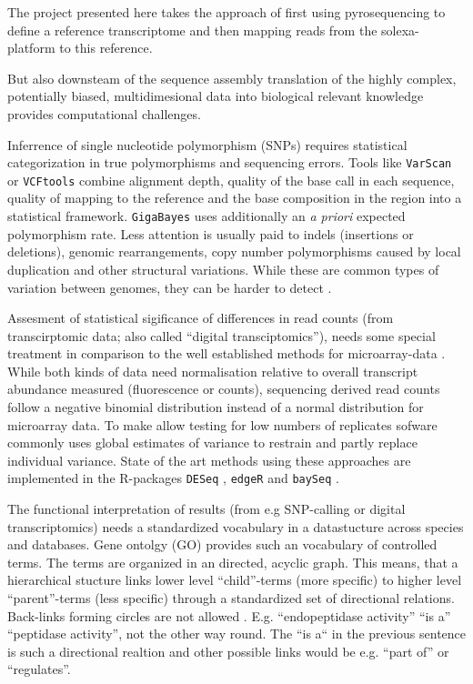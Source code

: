 The project presented here takes the approach of first using
pyrosequencing to define a reference transcriptome and then mapping
reads from the solexa-platform to this reference.

But also downsteam of the sequence assembly translation of the highly
complex, potentially biased, multidimesional data into biological
relevant knowledge provides computational challenges.

Inferrence of single nucleotide polymorphism (SNPs) requires
statistical categorization in true polymorphisms and sequencing
errors. Tools like \texttt{VarScan} \cite{pmid19542151} or
\texttt{VCFtools} \cite{pmid21653522} combine alignment depth, quality
of the base call in each sequence, quality of mapping to the reference
and the base composition in the region into a statistical
framework. \texttt{GigaBayes} \cite{pmid18204455} uses additionally an
\textit{a priori} expected polymorphism rate. Less attention is
usually paid to indels (insertions or deletions), genomic
rearrangements, copy number polymorphisms caused by local duplication
and other structural variations. While these are common types of
variation between genomes, they can be harder to detect
\cite{pmid22084086}.

Assesment of statistical sigificance of differences in read counts
(from transcirptomic data; also called ``digital transciptomics''),
needs some special treatment in comparison to the well established
methods for microarray-data \cite{smyth2005limma}. While both kinds of
data need normalisation relative to overall transcript abundance
measured (fluorescence or counts), sequencing derived read counts
follow a negative binomial distribution \cite{pmid17728317} instead of
a normal distribution for microarray data. To make allow testing for
low numbers of replicates sofware commonly uses global estimates of
variance to restrain and partly replace individual variance. State of
the art methods using these approaches are implemented in the
R-packages \texttt{DESeq} \cite{pmid20979621}, \texttt{edgeR}
\cite{pmid19910308} and \texttt{baySeq} \cite{pmid20698981}.

The functional interpretation of results (from e.g SNP-calling or
digital transcriptomics) needs a standardized vocabulary in a
datastucture across species and databases. Gene ontolgy (GO) provides
such an vocabulary of controlled terms.  The terms are organized in an
directed, acyclic graph. This means, that a hierarchical stucture
links lower level ``child''-terms (more specific) to higher level
``parent''-terms (less specific) through a standardized set of
directional relations. Back-links forming circles are not allowed
\cite{pmid10802651,pmid22123736}. E.g. ``endopeptidase activity'' ``is
a'' ``peptidase activity'', not the other way round. The ``is a`` in
the previous sentence is such a directional realtion and other
possible links would be e.g. ``part of'' or ``regulates''.


